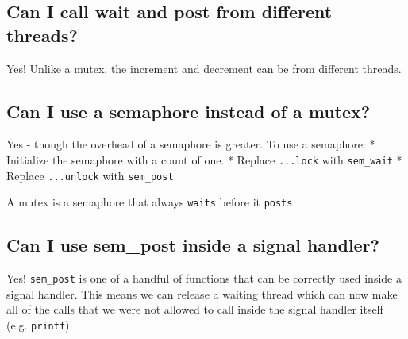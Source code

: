 \subsection{Can I call wait and post from different
threads?}\label{can-i-call-wait-and-post-from-different-threads}

Yes! Unlike a mutex, the increment and decrement can be from different
threads.

\subsection{Can I use a semaphore instead of a
mutex?}\label{can-i-use-a-semaphore-instead-of-a-mutex}

Yes - though the overhead of a semaphore is greater. To use a semaphore:
* Initialize the semaphore with a count of one. * Replace
\texttt{...lock} with \texttt{sem\_wait} * Replace \texttt{...unlock}
with \texttt{sem\_post}

A mutex is a semaphore that always \texttt{waits} before it
\texttt{posts}

\begin{Shaded}
\begin{Highlighting}[]
\NormalTok{, }\NormalTok{);}

\end{Highlighting}
\end{Shaded}

\subsection{Can I use sem\_post inside a signal
handler?}\label{can-i-use-semux5fpost-inside-a-signal-handler}

Yes! \texttt{sem\_post} is one of a handful of functions that can be
correctly used inside a signal handler. This means we can release a
waiting thread which can now make all of the calls that we were not
allowed to call inside the signal handler itself (e.g. \texttt{printf}).

